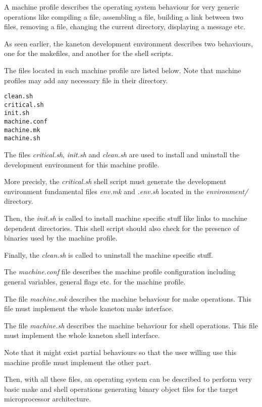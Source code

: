A machine profile describes the operating system behaviour for very
generic operations like compiling a file, assembling a file, building
a link between two files, removing a file, changing the current directory,
displaying a message etc.

As seen earlier, the kaneton development environment describes two
behaviours, one for the makefiles, and another for the shell scripts.

The files located in each machine profile are listed below. Note that
machine profiles may add any necessary file in their directory.

\begin{verbatim}
clean.sh
critical.sh
init.sh
machine.conf
machine.mk
machine.sh
\end{verbatim}

The files \textit{critical.sh}, \textit{init.sh} and \textit{clean.sh} are
used to install and uninstall the development environment for this
machine profile.

More precisly, the \textit{critical.sh} shell script must generate
the development environment fundamental files \textit{env.mk} and
\textit{.env.sh} located in the \textit{environment/} directory.

Then, the \textit{init.sh} is called to install machine specific stuff
like links to machine dependent directories. This shell script should also
check for the presence of binaries used by the machine profile.

Finally, the \textit{clean.sh} is called to uninstall the machine
specific stuff.

The \textit{machine.conf} file describes the machine profile configuration
including general variables, general flags etc. for the machine profile.

The file \textit{machine.mk} describes the machine behaviour for
make operations. This file must implement the whole kaneton make interface.

The file \textit{machine.sh} describes the machine behaviour for
shell operations. This file must implement the whole kaneton shell
interface.

Note that it might exist partial behaviours so that the user willing use
this machine profile must implement the other part.

Then, with all these files, an operating system can be described to
perform very basic make and shell operations generating binary object
files for the target microprocessor architecture.

